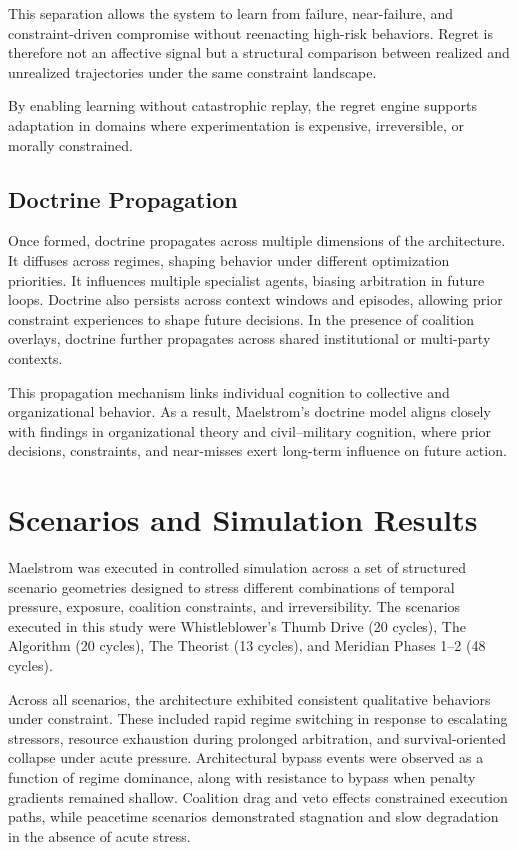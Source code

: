 \documentclass[11pt,a4paper]{article}
\begin{document}
This separation allows the system to learn from failure, near-failure, and constraint-driven compromise without reenacting high-risk behaviors. Regret is therefore not an affective signal but a structural comparison between realized and unrealized trajectories under the same constraint landscape.

By enabling learning without catastrophic replay, the regret engine supports adaptation in domains where experimentation is expensive, irreversible, or morally constrained.

\subsection{Doctrine Propagation}

Once formed, doctrine propagates across multiple dimensions of the architecture. It diffuses across regimes, shaping behavior under different optimization priorities. It influences multiple specialist agents, biasing arbitration in future loops. Doctrine also persists across context windows and episodes, allowing prior constraint experiences to shape future decisions. In the presence of coalition overlays, doctrine further propagates across shared institutional or multi-party contexts.

This propagation mechanism links individual cognition to collective and organizational behavior. As a result, Maelstrom's doctrine model aligns closely with findings in organizational theory and civil--military cognition, where prior decisions, constraints, and near-misses exert long-term influence on future action.

\section{Scenarios and Simulation Results}

Maelstrom was executed in controlled simulation across a set of structured scenario geometries designed to stress different combinations of temporal pressure, exposure, coalition constraints, and irreversibility. The scenarios executed in this study were Whistleblower's Thumb Drive (20 cycles), The Algorithm (20 cycles), The Theorist (13 cycles), and Meridian Phases 1--2 (48 cycles).

Across all scenarios, the architecture exhibited consistent qualitative behaviors under constraint. These included rapid regime switching in response to escalating stressors, resource exhaustion during prolonged arbitration, and survival-oriented collapse under acute pressure. Architectural bypass events were observed as a function of regime dominance, along with resistance to bypass when penalty gradients remained shallow. Coalition drag and veto effects constrained execution paths, while peacetime scenarios demonstrated stagnation and slow degradation in the absence of acute stress.
\end{document}

